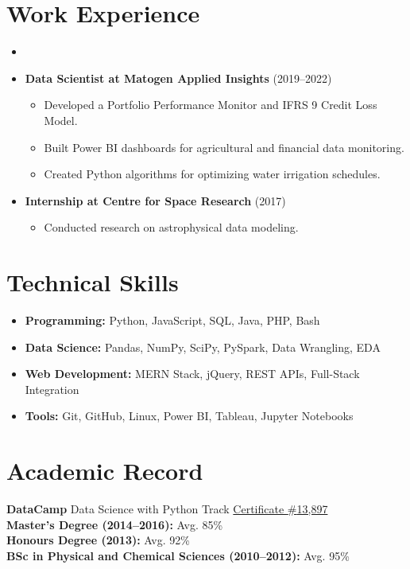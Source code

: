 \documentclass[a4paper,10pt]{article}
\begin{document}
\section*{Work Experience}
\begin{itemize}
	\item 
	\item \textbf{Data Scientist at Matogen Applied Insights} (2019--2022)
	\begin{itemize}
		\item Developed a Portfolio Performance Monitor and IFRS 9 Credit Loss Model.
		\item Built Power BI dashboards for agricultural and financial data monitoring.
		\item Created Python algorithms for optimizing water irrigation schedules.
	\end{itemize}
	\item \textbf{Internship at Centre for Space Research} (2017)
	\begin{itemize}
		\item Conducted research on astrophysical data modeling.
	\end{itemize}
\end{itemize}

\section*{Technical Skills}
\begin{itemize}
	\item \textbf{Programming:} Python, JavaScript, SQL, Java, PHP, Bash
	\item \textbf{Data Science:} Pandas, NumPy, SciPy, PySpark, Data Wrangling, EDA
	\item \textbf{Web Development:} MERN Stack, jQuery, REST APIs, Full-Stack Integration
	\item \textbf{Tools:} Git, GitHub, Linux, Power BI, Tableau, Jupyter Notebooks
\end{itemize}

\section*{Academic Record}
\textbf{DataCamp} Data Science with Python Track \href{https://github.com/HenriBranken/Henri_Branken_Certification/blob/master/online_courses/datacamp_dot_com/datacamp_Data_Scientist_with_Python_Track.pdf}{Certificate {\#}13,897} \\
\textbf{Master’s Degree (2014--2016):} Avg. 85\% \\
\textbf{Honours Degree (2013):} Avg. 92\% \\
\textbf{BSc in Physical and Chemical Sciences (2010--2012):} Avg. 95\%
\end{document}
